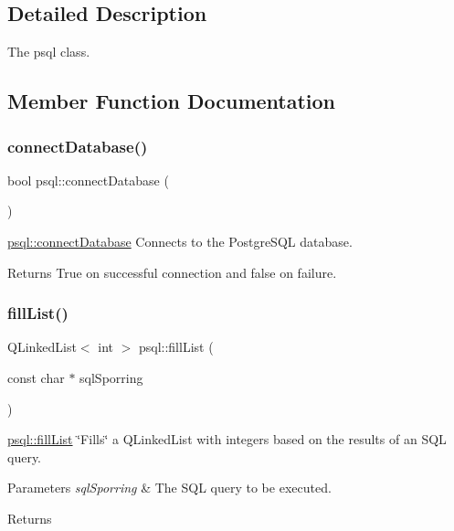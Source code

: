 \subsection{Detailed Description}
The psql class. 

\subsection{Member Function Documentation}
\mbox{\label{classpsql_ada485c933df77453629e3821ab19fa4c}} 
\subsubsection{\texorpdfstring{connect\+Database()}{connectDatabase()}}
{\footnotesize\ttfamily bool psql\+::connect\+Database (\begin{DoxyParamCaption}{ }\end{DoxyParamCaption})}



\hyperlink{classpsql_ada485c933df77453629e3821ab19fa4c}{psql\+::connect\+Database} Connects to the Postgre\+S\+QL database. 

\begin{DoxyReturn}{Returns}
True on successful connection and false on failure. 
\end{DoxyReturn}
\mbox{\label{classpsql_ad5ac3722cffd31587435b1bee640a5e2}} 
\subsubsection{\texorpdfstring{fill\+List()}{fillList()}}
{\footnotesize\ttfamily Q\+Linked\+List$<$ int $>$ psql\+::fill\+List (\begin{DoxyParamCaption}\item[{const char $\ast$}]{sql\+Sporring }\end{DoxyParamCaption})}



\hyperlink{classpsql_ad5ac3722cffd31587435b1bee640a5e2}{psql\+::fill\+List} \char`\"{}\+Fills\char`\"{} a Q\+Linked\+List with integers based on the results of an S\+QL query. 


\begin{DoxyParams}{Parameters}
{\em sql\+Sporring} & The S\+QL query to be executed. \\
\hline
\end{DoxyParams}
\begin{DoxyReturn}{Returns}

\end{DoxyReturn}
\mbox{\label{classpsql_af3462a12dc106e0ca8df4fa8fcf28436}} 
